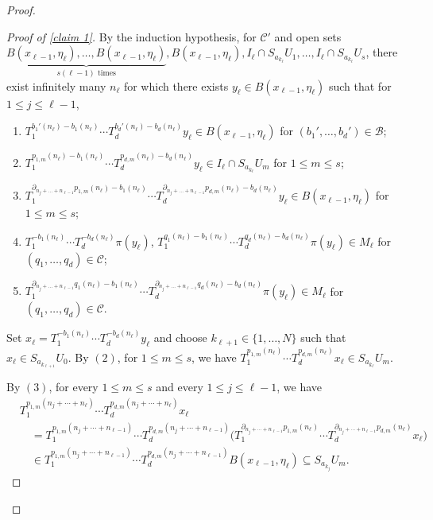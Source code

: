 \documentclass[11pt,reqno]{amsart}
\newcommand{\cB}{{\mathcal B}}
\newcommand{\cC}{{\mathcal C}}
\theoremstyle{definition}
\theoremstyle{remark}
\begin{document}
\begin{proof}
\begin{proof}[Proof of \cref{claim 1}]
    By the induction hypothesis, for $\cC'$ and open sets $\underbrace{B(x_{\ell-1},\eta_{\ell}),\dots, B(x_{\ell-1},\eta_{\ell})}_{s(\ell-1)\text{ times}},B(x_{\ell-1},\eta_{\ell}),I_{\ell}\cap S_{a_{k_{\ell}}}U_1,\dots,I_{\ell}\cap S_{a_{k_{\ell}}}U_s$, there exist infinitely many $n_\ell$ for which there exists $y_\ell\in B(x_{\ell-1},\eta_{\ell})$ such that for $1\leq j \leq \ell-1$,\begin{enumerate}
        \item $T_{1}^{b_1'(n_\ell)-b_1(n_\ell)}\cdots T_{d}^{b_d'(n_\ell)-b_d(n_\ell)}y_\ell \in B(x_{\ell-1},\eta_{\ell})$ for $(b_1',\dots,b_d')\in \cB$;
        \item $T_{1}^{p_{1,m}(n_\ell)-b_1(n_\ell)}\cdots T_{d}^{p_{d,m}(n_\ell)-b_d(n_\ell)}y_\ell \in I_\ell \cap S_{a_{k_\ell}}U_m$ for $1\leq m \leq s$;
        \item $T_1^{\partial_{n_j+\dots+n_{\ell-1}}p_{1,m}(n_\ell)-b_1(n_\ell)} \cdots T_d^{\partial_{n_j+\dots+n_{\ell-1}}p_{d,m}(n_\ell)-b_d(n_\ell)}y_\ell \in B(x_{\ell-1},\eta_\ell)$ for $1\leq m\leq s$;
        \item $T_1^{-b_1(n_\ell)}\cdots T_d^{-b_d(n_\ell)}\pi(y_\ell)$, $T_{1}^{q_1(n_\ell)-b_1(n_\ell)}\cdots T_{d}^{q_d(n_\ell)-b_d(n_\ell)}\pi(y_\ell)\in M_{\ell}$ for $(q_1,\dots,q_d)\in \cC$;
        \item $T_1^{\partial_{n_j+\dots+n_{\ell-1}}q_1(n_\ell)-b_1(n_\ell)}\cdots T_d^{\partial_{n_j+\dots+n_{\ell-1}}q_d(n_\ell)-b_d(n_\ell)}\pi(y_\ell)\in M_{\ell}$ for $(q_1,\dots,q_d)\in \cC$.
    \end{enumerate}

    Set $x_{\ell} = T_{1}^{-b_1(n_\ell)}\cdots T_d^{-b_d(n_\ell)}y_{\ell}$ and choose $k_{\ell+1}\in \{1,\dots,N\}$ such that $x_\ell\in S_{a_{k_{\ell+1}}}U_0$. By $(2)$, for $1\leq m\leq s$, we have $T_{1}^{p_{1,m}(n_\ell)}\cdots T_d^{p_{d,m}(n_\ell)}x_\ell\in S_{a_{k_\ell}}U_m$.

    By $(3)$, for every $1\leq m\leq s$ and every $1\leq j \leq \ell-1$, we have\begin{align*}
&T_1^{p_{1,m}(n_j+\cdots+n_\ell)}\cdots 
 T_d^{p_{d,m}(n_j+\cdots+n_\ell)}x_\ell       \\
&\quad =
T_1^{p_{1,m}(n_j+\cdots+n_{\ell-1})}\cdots 
T_d^{p_{d,m}(n_j+\cdots+n_{\ell-1})} 
\Big(
T_1^{\partial_{n_j+\cdots+n_{\ell-1}}p_{1,m}(n_\ell)}\cdots 
T_d^{\partial_{n_j+\cdots+n_{\ell-1}}p_{d,m}(n_\ell)}
x_\ell
\Big)                                        \\
&\quad \in
T_1^{p_{1,m}(n_j+\cdots+n_{\ell-1})}\cdots
T_d^{p_{d,m}(n_j+\cdots+n_{\ell-1})}
B(x_{\ell-1},\eta_\ell)   \subseteq S_{a_{k_j}}U_m .
\end{align*}


\end{proof}
\end{proof}
\end{document}
